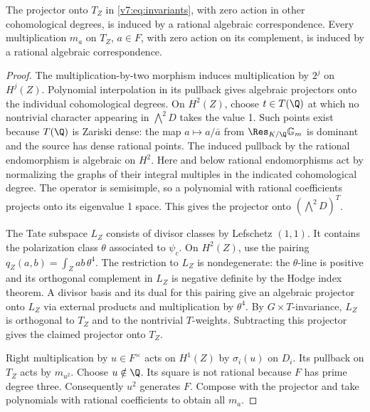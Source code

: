 \begin{proposition}\label{v7:prop:proj}
The projector onto \(T_Z\) in \eqref{v7:eq:invariants}, with zero action in other cohomological degrees, is induced by a rational algebraic correspondence. Every multiplication \(m_a\) on \(T_Z\), \(a\in F\), with zero action on its complement, is induced by a rational algebraic correspondence.
\end{proposition}
\begin{proof}
The multiplication-by-two morphism induces multiplication by \(2^j\) on \(H^j(Z)\). Polynomial interpolation in its pullback gives algebraic projectors onto the individual cohomological degrees. On \(H^2(Z)\), choose \(t\in T(\Q)\) at which no nontrivial character appearing in \(\bigwedge^2 D\) takes the value 1. Such points exist because \(T(\Q)\) is Zariski dense: the map \(a\mapsto a/\bar a\) from \(\Res_{K/\Q}\mathbb G_m\) is dominant and the source has dense rational points. The induced pullback by the rational endomorphism is algebraic on \(H^2\). Here and below rational endomorphisms act by normalizing the graphs of their integral multiples in the indicated cohomological degree. The operator is semisimple, so a polynomial with rational coefficients projects onto its eigenvalue 1 space. This gives the projector onto \((\bigwedge^2D)^T\).

The Tate subspace \(L_Z\) consists of divisor classes by Lefschetz \((1,1)\). It contains the polarization class \(\theta\) associated to \(\psi_c\). On \(H^2(Z)\), use the pairing
\(q_Z(a,b)=\int_Z a b\,\theta^4\). The restriction to \(L_Z\) is nondegenerate: the \(\theta\)-line is positive and its orthogonal complement in \(L_Z\) is negative definite by the Hodge index theorem. A divisor basis and its dual for this pairing give an algebraic projector onto \(L_Z\) via external products and multiplication by \(\theta^4\). By \(G\times T\)-invariance, \(L_Z\) is orthogonal to \(T_Z\) and to the nontrivial \(T\)-weights. Subtracting this projector gives the claimed projector onto \(T_Z\).

Right multiplication by \(u\in F^\times\) acts on \(H^1(Z)\) by \(\sigma_i(u)\) on \(D_i\). Its pullback on \(T_Z\) acts by \(m_{u^2}\). Choose \(u\notin\Q\). Its square is not rational because \(F\) has prime degree three. Consequently \(u^2\) generates \(F\). Compose with the projector and take polynomials with rational coefficients to obtain all \(m_a\).
\end{proof}

